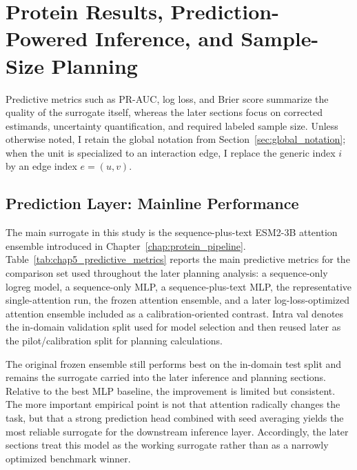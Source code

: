 \chapter{Protein Results, Prediction-Powered Inference, and Sample-Size Planning}
\label{chap:protein_results}

Predictive metrics such as PR-AUC, log loss, and Brier score summarize the quality of the surrogate itself, whereas the later sections focus on corrected estimands, uncertainty quantification, and required labeled sample size. Unless otherwise noted, I retain the global notation from Section~\ref{sec:global_notation}; when the unit is specialized to an interaction edge, I replace the generic index \(i\) by an edge index \(e = (u,v)\).

\section[Prediction Layer]{Prediction Layer: Mainline Performance}

The main surrogate in this study is the sequence-plus-text ESM2-3B attention ensemble introduced in Chapter~\ref{chap:protein_pipeline}. Table~\ref{tab:chap5_predictive_metrics} reports the main predictive metrics for the comparison set used throughout the later planning analysis: a sequence-only logreg model, a sequence-only MLP, a sequence-plus-text MLP, the representative single-attention run, the frozen attention ensemble, and a later log-loss-optimized attention ensemble included as a calibration-oriented contrast. Intra val denotes the in-domain validation split used for model selection and then reused later as the pilot/calibration split for planning calculations.


The original frozen ensemble still performs best on the in-domain test split and remains the surrogate carried into the later inference and planning sections. Relative to the best MLP baseline, the improvement is limited but consistent. The more important empirical point is not that attention radically changes the task, but that a strong prediction head combined with seed averaging yields the most reliable surrogate for the downstream inference layer. Accordingly, the later sections treat this model as the working surrogate rather than as a narrowly optimized benchmark winner.

